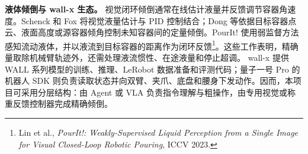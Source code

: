 \textbf{液体倾倒与 wall-x 生态。}
视觉闭环倾倒通常在线估计液量并反馈调节容器角速度。Schenck 和 Fox 将视觉液量估计与 PID 控制结合；Dong 等依据目标容器点云、液面高度或源容器倾角控制未知容器间的定量倾倒。PourIt! 使用弱监督方法感知流动液体，并以液流到目标容器的距离作为闭环反馈\footnote{Lin et al., \emph{PourIt!: Weakly-Supervised Liquid Perception from a Single Image for Visual Closed-Loop Robotic Pouring}, ICCV 2023.}。这些工作表明，精确量取除机械臂轨迹外，还需处理液流惯性、在途液量和停止超调。
wall-x 提供 WALL 系列模型的训练、推理、LeRobot 数据准备和评测代码；量子一号 Pro 的机器人 SDK 则负责读取状态并向双臂、夹爪、底盘和腰身下发动作。因而，本项目可采用分层结构：由 Agent 或 VLA 负责指令理解与粗操作，由专用视觉或称重反馈控制器完成精确倾倒。
